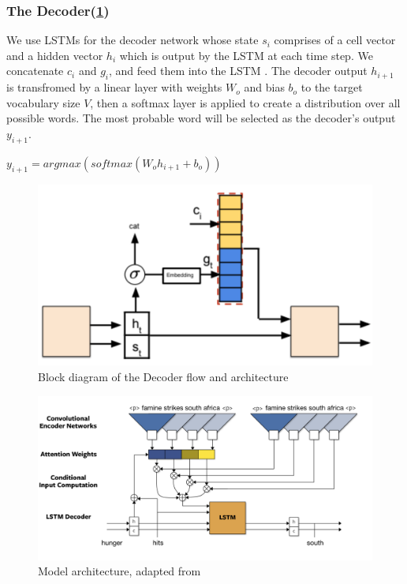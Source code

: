 \documentclass{article}
\begin{document}
\begin{flushleft}
\subsubsection{The Decoder(\ref{fig:dec})}
We use LSTMs \cite{hochreiter1997lstm} for the decoder network whose state $s_i$ comprises of a cell vector and a hidden vector $h_i$ which is output by the LSTM at each time step. We concatenate $c_i$ and $g_i$, and feed them into the LSTM .
The decoder output $h_{i+1}$ is transfromed by a linear layer with weights $W_o$ and bias $b_o$ to the target vocabulary size $V$, then a softmax layer is applied to create a distribution over all possible words. The most probable word will be selected as the decoder's output $y_{i+1}$. 
\vspace{5mm}
\begin{center}
$y_{i+1}=argmax(softmax(W_oh_{i+1}+b_o))$\vspace{5mm}
\end{center}
\end{flushleft}

\begin{figure}[h]
    \centering
	\captionsetup{justification=centering,margin=2cm}
    \includegraphics[scale=0.35]{Decoder_Flow}
    \caption{Block diagram of the Decoder flow and architecture}
    \label{fig:dec}
\end{figure}

\begin{figure}[h]
    \centering
	\captionsetup{justification=centering,margin=2cm}
    \includegraphics[scale=0.35]{Full_Architecture}
    \caption{Model architecture, adapted from \cite{DBLP:journals/corr/GehringAGD16}}
    \label{fig:full}
\end{figure}
\end{document}
